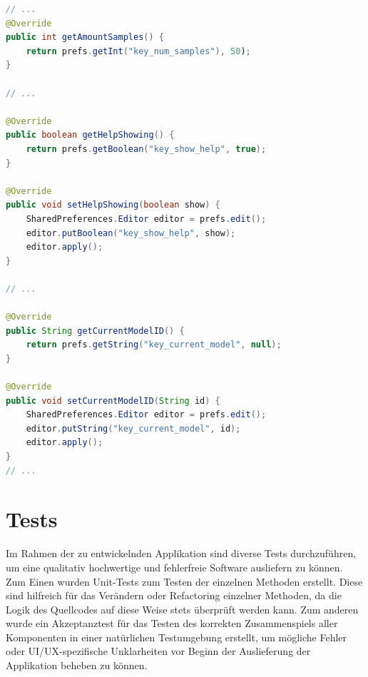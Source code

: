 \documentclass[oneside]{ausarbeitung}
\begin{document}
\begin{minipage}{\linewidth}
	\begin{lstlisting}[language=Java, breaklines=true, caption={Auschnitt aus SharedPrefsHelper}]
// ...
@Override
public int getAmountSamples() {
	return prefs.getInt("key_num_samples"), 50);
}

// ...

@Override
public boolean getHelpShowing() {
	return prefs.getBoolean("key_show_help", true);
}

@Override
public void setHelpShowing(boolean show) {
	SharedPreferences.Editor editor = prefs.edit();
	editor.putBoolean("key_show_help", show);
	editor.apply();
}

// ...

@Override
public String getCurrentModelID() {
	return prefs.getString("key_current_model", null);
}

@Override
public void setCurrentModelID(String id) {
	SharedPreferences.Editor editor = prefs.edit();
	editor.putString("key_current_model", id);
	editor.apply();
}
// ...
	\end{lstlisting}
\end{minipage}
\label{lst:shared-prefs}

\chapter{Tests}
\label{cha:tests}
Im Rahmen der zu entwickelnden Applikation sind diverse Tests durchzuführen, um eine qualitativ hochwertige und fehlerfreie Software ausliefern zu können.\\
Zum Einen wurden Unit-Tests zum Testen der einzelnen Methoden erstellt. Diese sind hilfreich für das Verändern oder Refactoring einzelner Methoden, da die Logik des Quellcodes auf diese Weise stets überprüft werden kann. Zum anderen wurde ein Akzeptanztest für das Testen des korrekten Zusammenspiels aller Komponenten in einer natürlichen Testumgebung erstellt, um mögliche Fehler oder UI/UX-spezifische Unklarheiten vor Beginn der Auslieferung der Applikation beheben zu können.
\end{document}
